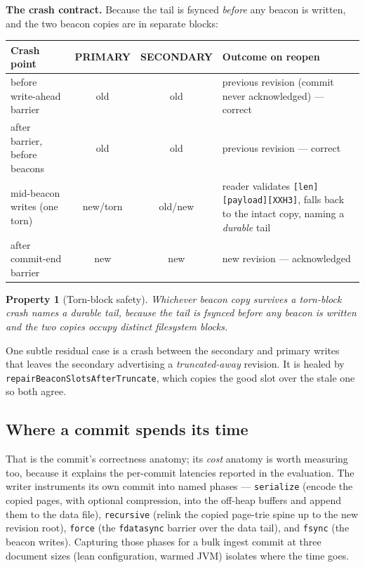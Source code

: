 \documentclass[11pt,a4paper,oneside]{report}
\theoremstyle{sirixthm}
\newtheorem{property}{Property}[chapter]
\newcommand{\code}[1]{\texttt{#1}}
\begin{document}
\textbf{The crash contract.} Because the tail is fsynced \emph{before} any beacon is
written, and the two beacon copies are in separate blocks:

\begin{table}[h]
\small\setlength{\tabcolsep}{5pt}
\renewcommand{\arraystretch}{1.2}
\begin{tabularx}{\linewidth}{@{}l c c X@{}}
\toprule
\textbf{Crash point} & \textbf{PRIMARY} & \textbf{SECONDARY} & \textbf{Outcome on reopen}\\
\midrule
before write-ahead barrier & old & old & previous revision (commit never acknowledged) --- correct\\
after barrier, before beacons & old & old & previous revision --- correct\\
mid-beacon writes (one torn) & new/torn & old/new & reader validates \code{[len][payload][XXH3]}, falls back to the intact copy, naming a \emph{durable} tail\\
after commit-end barrier & new & new & new revision --- acknowledged\\
\bottomrule
\end{tabularx}
\end{table}

\begin{property}[Torn-block safety]\label{prop:torn}
Whichever beacon copy survives a torn-block crash names a durable tail, because the tail is
fsynced before any beacon is written and the two copies occupy distinct filesystem blocks.
\end{property}
One subtle residual case is a crash between the secondary and primary writes that leaves the
secondary advertising a \emph{truncated-away} revision. It is healed by
\code{repairBeaconSlotsAfterTruncate}, which copies the good slot over the stale one so both
agree.

\subsection*{Where a commit spends its time}
\label{sec:commitphases}

That is the commit's correctness anatomy; its \emph{cost} anatomy is worth measuring too, because it
explains the per-commit latencies reported in the evaluation. The writer instruments its own commit into
named phases --- \code{serialize} (encode the copied pages, with optional compression, into the off-heap
buffers and append them to the data file), \code{recursive} (relink the copied page-trie spine up to the
new revision root), \code{force} (the \code{fdatasync} barrier over the data tail), and \code{fsync} (the
beacon writes). Capturing those phases for a bulk ingest commit at three document sizes (lean
configuration, warmed JVM) isolates where the time goes.
\end{document}

